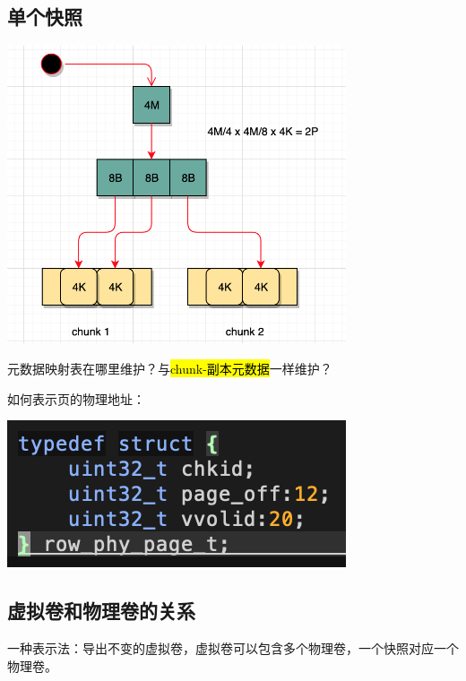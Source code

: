 \subsection{单个快照}

\begin{center}
\includegraphics[width=10cm]{../imgs/snapshot-head.png}
\end{center}

元数据映射表在哪里维护？与\hl{chunk-副本元数据}一样维护？


如何表示页的物理地址：
\begin{center}
\includegraphics[width=10cm]{../imgs/row-phy-page.png}
\end{center}

\subsection{虚拟卷和物理卷的关系}

一种表示法：导出不变的虚拟卷，虚拟卷可以包含多个物理卷，一个快照对应一个物理卷。

